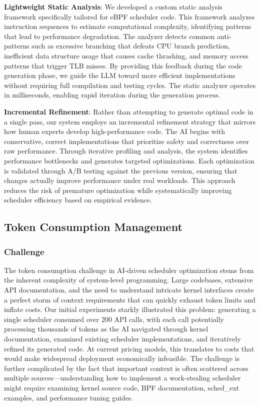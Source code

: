\textbf{Lightweight Static Analysis}: We developed a custom static analysis framework specifically tailored for eBPF scheduler code. This framework analyzes instruction sequences to estimate computational complexity, identifying patterns that lead to performance degradation. The analyzer detects common anti-patterns such as excessive branching that defeats CPU branch prediction, inefficient data structure usage that causes cache thrashing, and memory access patterns that trigger TLB misses. By providing this feedback during the code generation phase, we guide the LLM toward more efficient implementations without requiring full compilation and testing cycles. The static analyzer operates in milliseconds, enabling rapid iteration during the generation process.

\textbf{Incremental Refinement}: Rather than attempting to generate optimal code in a single pass, our system employs an incremental refinement strategy that mirrors how human experts develop high-performance code. The AI begins with conservative, correct implementations that prioritize safety and correctness over raw performance. Through iterative profiling and analysis, the system identifies performance bottlenecks and generates targeted optimizations. Each optimization is validated through A/B testing against the previous version, ensuring that changes actually improve performance under real workloads. This approach reduces the risk of premature optimization while systematically improving scheduler efficiency based on empirical evidence.

\subsection{Token Consumption Management}

\subsubsection{Challenge}
The token consumption challenge in AI-driven scheduler optimization stems from the inherent complexity of system-level programming. Large codebases, extensive API documentation, and the need to understand intricate kernel interfaces create a perfect storm of context requirements that can quickly exhaust token limits and inflate costs. Our initial experiments starkly illustrated this problem: generating a single scheduler consumed over 200 API calls, with each call potentially processing thousands of tokens as the AI navigated through kernel documentation, examined existing scheduler implementations, and iteratively refined its generated code. At current pricing models, this translates to costs that would make widespread deployment economically infeasible. The challenge is further complicated by the fact that important context is often scattered across multiple sources—understanding how to implement a work-stealing scheduler might require examining kernel source code, BPF documentation, sched\_ext examples, and performance tuning guides.

